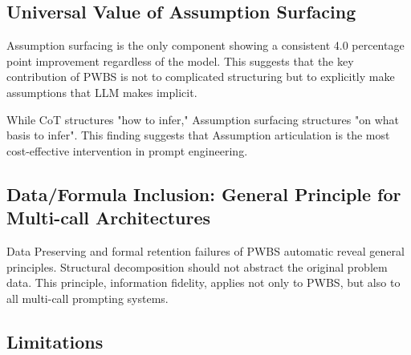 \documentclass[11pt,a4paper]{article}
\begin{document}
\subsection{Universal Value of Assumption Surfacing}

Assumption surfacing is the only component showing a consistent 4.0 percentage point improvement regardless of the model. This suggests that the key contribution of PWBS is not to complicated structuring but to explicitly make assumptions that LLM makes implicit.

While CoT structures "how to infer," Assumption surfacing structures "on what basis to infer". This finding suggests that Assumption articulation is the most cost-effective intervention in prompt engineering.

\subsection{Data/Formula Inclusion: General Principle for Multi-call Architectures}

Data Preserving and formal retention failures of PWBS automatic reveal general principles. Structural decomposition should not abstract the original problem data. This principle, information fidelity, applies not only to PWBS, but also to all multi-call prompting systems.

\subsection{Limitations}
\end{document}
